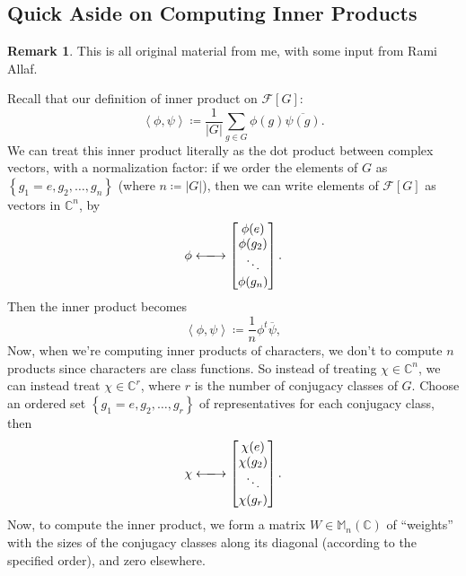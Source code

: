 \documentclass[12pt]{article}
\newcommand{\cx}{\mathbb{C}}
\newcommand\setb[1]{\left \{ #1 \right \}}
\newcommand{\vbrack}[1]{\left \langle #1 \right \rangle}
\theoremstyle{definition}
\newtheorem*{remark}{Remark}
\newcommand{\m}{\mathbb{M}}
\begin{document}
\subsection{Quick Aside on Computing Inner Products}
\begin{remark}
    This is all original material from me, with some input from Rami Allaf.
\end{remark}
Recall that our definition of inner product on $\mathcal{F}[G]$: 
\begin{equation}
    \vbrack{\phi , \psi} \coloneqq  \frac{1}{|G|} \sum\limits_{g \in G} \phi(g) \overline{\psi(g)}.
\end{equation}
We can treat this inner product literally as the dot product between complex vectors, with a normalization factor: if we order the elements of $G$ as $\setb{g_1 = e , g_2 , \dotsc , g_n}$ (where $n\coloneqq |G|$), then we can write elements of $\mathcal{F}[G]$ as vectors in $\cx^n$, by 
\begin{equation}
    \phi \xlongleftrightarrow{} 
    \begin{bmatrix}
        \phi(e) \\
        \phi(g_2) \\
        \ddots \\
        \phi(g_n)
    \end{bmatrix}.
\end{equation}
Then the inner product becomes 
\begin{equation}
    \vbrack{\phi , \psi} \coloneqq  \frac{1}{n} \phi^t \overline{\psi},
\end{equation}
Now, when we're computing inner products of characters, we don't to compute $n$ products since characters are class functions. So instead of treating $\chi \in \cx^n$, we can instead treat $\chi \in \cx^r$, where $r$ is the number of conjugacy classes of $G$. Choose an ordered set $\setb{g_1 = e , g_2 , \dotsc , g_r}$ of representatives for each conjugacy class, then 
\begin{equation}
    \chi \xlongleftrightarrow{} 
    \begin{bmatrix}
        \chi(e) \\
        \chi(g_2) \\
        \ddots \\
        \chi(g_r)
    \end{bmatrix}.
\end{equation}
Now, to compute the inner product, we form a matrix $W \in \m_n(\cx)$ of ``weights'' with the sizes of the conjugacy classes along its diagonal (according to the specified order), and zero elsewhere.
\end{document}
